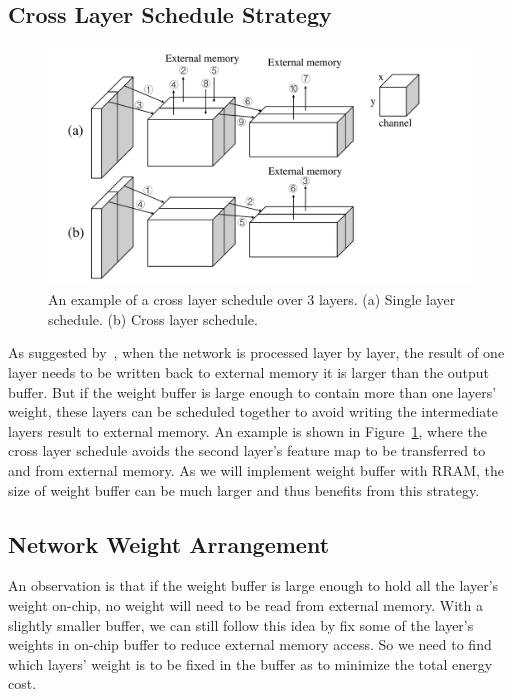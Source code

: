 \documentclass[10pt, conference]{IEEEtran}
\begin{document}
    \subsection{Cross Layer Schedule Strategy}
    \begin{figure}[t]
      \centering
      \includegraphics[width=1\columnwidth]{fig/cross_layer.pdf}
      \caption{An example of a cross layer schedule over 3 layers. (a) Single layer schedule. (b) Cross layer schedule.}
      \label{fig:cross_layer}
    \end{figure}
    
    As suggested by~\cite{alwani2016fused}, when the network is processed layer by layer, the result of one layer needs to be written back to external memory it is larger than the output buffer. But if the weight buffer is large enough to contain more than one layers' weight, these layers can be scheduled together to avoid writing the intermediate layers result to external memory. An example is shown in Figure~\ref{fig:cross_layer}, where the cross layer schedule avoids the second layer's feature map to be transferred to and from external memory. As we will implement weight buffer with RRAM, the size of weight buffer can be much larger and thus benefits from this strategy.
    
    \subsection{Network Weight Arrangement}
    An observation is that if the weight buffer is large enough to hold all the layer's weight on-chip, no weight will need to be read from external memory. With a slightly smaller buffer, we can still follow this idea by fix some of the layer's weights in on-chip buffer to reduce external memory access. So we need to find which layers' weight is to be fixed in the buffer as to minimize the total energy cost.
    
\end{document}

